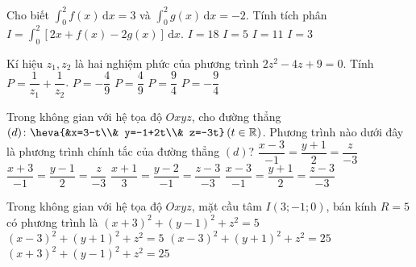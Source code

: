 \begin{ex}%
Cho biết $\displaystyle \int_{0}^{2} f(x) \mathrm{\, d}x=3$ và $\displaystyle \int_{0}^{2} g(x) \mathrm{\, d}x=-2$. Tính tích phân $I= \displaystyle \int_{0}^{2} [2x+f(x)-2g(x)] \mathrm{\, d}x$.
\choice
{$I=18$}
{$I=5$}
{\True $I=11$}
{$I=3$}
\end{ex}
\begin{ex}%
Kí hiệu $z_1, z_2$ là hai nghiệm phức của phương trình $2z^2-4z+9=0$. Tính $P=\dfrac{1}{z_1}+\dfrac{1}{z_2}$.
\choice
{$P=-\dfrac{4}{9}$}
{\True $P=\dfrac{4}{9}$}
{$P=\dfrac{9}{4}$}
{$P=-\dfrac{9}{4}$}
\end{ex}
\begin{ex}%
Trong không gian với hệ tọa độ $Oxyz$, cho đường thẳng $(d)\colon \heva {&x=3-t\\& y=-1+2t\\& z=-3t}\,(t\in \mathbb{R})$. Phương trình nào dưới đây là phương trình chính tắc của đường thẳng $(d)$?
\choice
{\True $\dfrac{x-3}{-1}=\dfrac{y+1}{2}=\dfrac{z}{-3}$}
{$\dfrac{x+3}{-1}=\dfrac{y-1}{2}=\dfrac{z}{-3}$}
{$\dfrac{x+1}{3}=\dfrac{y-2}{-1}=\dfrac{z-3}{-3}$}
{$\dfrac{x-3}{-1}=\dfrac{y+1}{2}=\dfrac{z-3}{-3}$}
\end{ex}
\begin{ex}%
Trong không gian với hệ tọa độ $Oxyz$, mặt cầu tâm $I(3;-1;0)$, bán kính $R=5$ có phương trình là
\choice
{$(x+3)^2+(y-1)^2+z^2=5$}
{$(x-3)^2+(y+1)^2+z^2=5$}
{\True $(x-3)^2+(y+1)^2+z^2=25$}
{$(x+3)^2+(y-1)^2+z^2=25$}
\end{ex}

